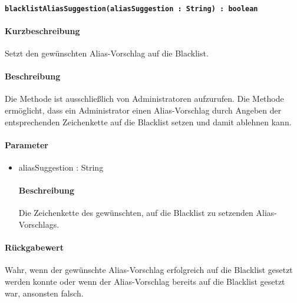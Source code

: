 \paragraph{\texttt{blacklistAliasSuggestion(aliasSuggestion : String) : boolean}}%
\paragraph*{Kurzbeschreibung}
Setzt den gewünschten Alias-Vorschlag auf die Blacklist.
\paragraph*{Beschreibung}
Die Methode ist ausschließlich von Administratoren aufzurufen.
Die Methode ermöglicht, dass ein Administrator einen Alias-Vorschlag durch Angeben der entsprechenden Zeichenkette auf die Blacklist setzen und damit ablehnen kann.
\paragraph*{Parameter}
\begin{itemize}
	\item aliasSuggestion : String
		\paragraph*{Beschreibung}
		Die Zeichenkette des gewünschten, auf die Blacklist zu setzenden Alias-Vorschlags.
\end{itemize}
\paragraph*{Rückgabewert}
Wahr, wenn der gewünschte Alias-Vorschlag erfolgreich auf die Blacklist gesetzt werden konnte oder wenn der Alias-Vorschlag bereits auf die Blacklist gesetzt war, ansonsten falsch.
